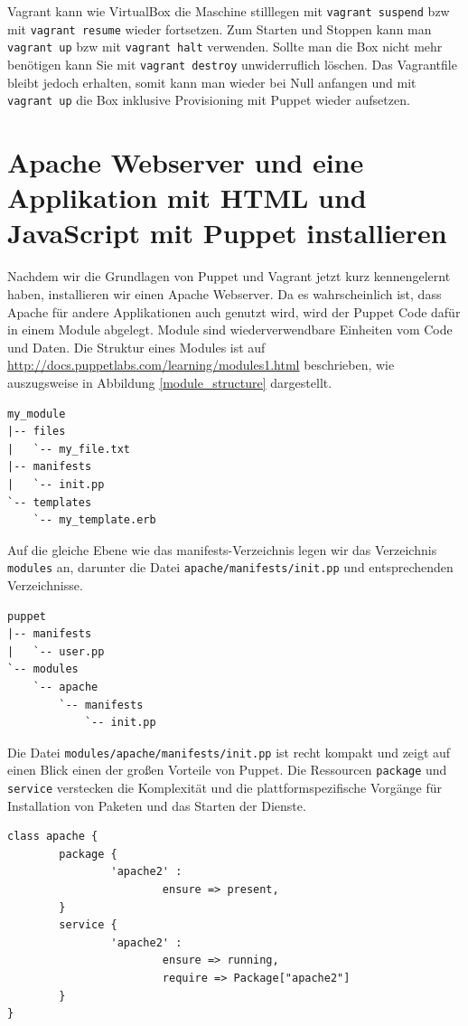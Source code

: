 \documentclass[12pt,a4paper,ngerman]{article}
\begin{document}
Vagrant kann wie VirtualBox die Maschine stilllegen mit \lstinline$vagrant suspend$ bzw mit \lstinline$vagrant resume$ wieder fortsetzen. Zum Starten und Stoppen kann man \lstinline$vagrant up$ bzw mit \lstinline$vagrant halt$ verwenden.  Sollte man die Box nicht mehr benötigen kann Sie mit \lstinline$vagrant destroy$ unwiderruflich löschen. Das Vagrantfile bleibt jedoch erhalten, somit kann man wieder bei Null anfangen und mit \lstinline$vagrant up$ die Box inklusive Provisioning mit Puppet wieder aufsetzen.

\section{Apache Webserver und eine Applikation mit HTML und JavaScript mit Puppet installieren}
Nachdem wir die Grundlagen von Puppet und Vagrant jetzt kurz kennengelernt haben, installieren wir einen Apache Webserver. Da es wahrscheinlich ist, dass Apache für andere Applikationen auch genutzt wird, wird der Puppet Code dafür in einem Module abgelegt. Module sind wiederverwendbare Einheiten vom Code und Daten. Die Struktur eines Modules ist auf \url{http://docs.puppetlabs.com/learning/modules1.html} beschrieben, wie auszugsweise in Abbildung \ref{module_structure} dargestellt.
\begin{lstlisting}[language=tree,caption=Puppet Module Struktur, label=module_structure]
my_module
|-- files
|   `-- my_file.txt
|-- manifests
|   `-- init.pp
`-- templates
    `-- my_template.erb
\end{lstlisting}


Auf die gleiche Ebene wie das manifests-Verzeichnis legen wir das Verzeichnis \lstinline$modules$ an, darunter die Datei \lstinline$apache/manifests/init.pp$ und entsprechenden Verzeichnisse.
\begin{lstlisting}[language=tree,caption=Verzeichnisstruktur für den apache-Module, label=apache-module]
puppet
|-- manifests
|   `-- user.pp
`-- modules
    `-- apache
        `-- manifests
            `-- init.pp
\end{lstlisting}

Die Datei \lstinline$modules/apache/manifests/init.pp$ ist recht kompakt und zeigt auf einen Blick einen der großen Vorteile von Puppet. Die Ressourcen \lstinline$package$ und \lstinline$service$ verstecken die Komplexität und die plattformspezifische Vorgänge für Installation von Paketen und das Starten der Dienste.
\begin{lstlisting}[language=puppet,caption=Inhalt von modules/apache/manifests/init.pp, label=apache-init.pp]
class apache {
        package {
                'apache2' :
                        ensure => present,
        }
        service {
                'apache2' :
                        ensure => running,
                        require => Package["apache2"]
        }
}
\end{lstlisting}
\end{document}
